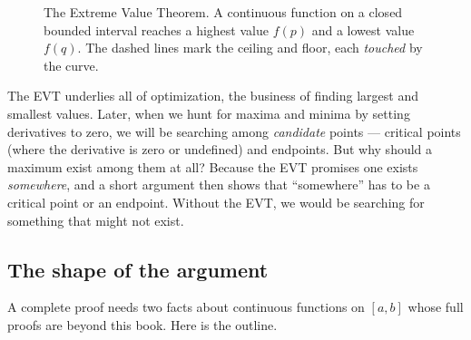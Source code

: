 \begin{figure}[htbp]
\centering
{}
\caption{The Extreme Value Theorem. A continuous function on a closed bounded interval
reaches a highest value $f(p)$ and a lowest value $f(q)$. The dashed lines mark
the ceiling and floor, each \emph{touched} by the curve.}
\label{ch08:fig-evt}
\end{figure}

\begin{focusbox}
The EVT underlies all of optimization, the business of finding largest and smallest
values. Later, when we hunt for maxima
and minima by setting derivatives to zero, we will be searching among \emph{candidate}
points --- critical points (where the derivative is zero or undefined) and endpoints. But
why should a maximum exist among them at all?
Because the EVT promises one exists \emph{somewhere}, and a short argument then shows that
``somewhere'' has to be a critical point or an endpoint. Without the EVT, we would be
searching for something that might not exist.
\end{focusbox}

\subsection{The shape of the argument}

A complete proof needs two facts about continuous functions on $[a,b]$ whose full proofs
are beyond this book. Here is the outline.


